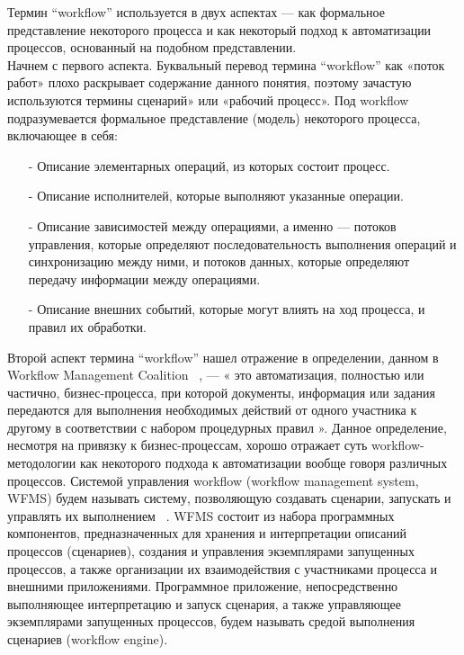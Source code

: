 \documentclass[a4paper,12pt]{article}
\begin{document}
Термин “workflow” используется в двух аспектах — как формальное
представление некоторого процесса и как некоторый подход к автоматизации процессов, основанный на подобном представлении.\\
Начнем с первого аспекта. Буквальный перевод термина “workflow”
как «поток работ» плохо раскрывает содержание данного понятия, поэтому
зачастую используются термины сценарий» или «рабочий процесс». Под workflow подразумевается формальное представление (модель) некоторого процесса, включающее в себя:
\begin{enumerate}
\item[-] Описание элементарных операций, из которых состоит процесс.
\item[-] Описание исполнителей, которые выполняют указанные операции.
\item[-] Описание зависимостей между операциями, а именно — потоков управления, которые определяют последовательность выполнения
операций и синхронизацию между ними, и потоков данных, которые
определяют передачу информации между операциями.
\item[-] Описание внешних событий, которые могут влиять на ход процесса, и правил их обработки.
\end{enumerate}
Второй аспект термина “workflow” нашел отражение в определении,
данном в Workflow Management Coalition ~\cite{2}, — « это автоматизация, полностью или частично, бизнес-процесса, при которой документы, информация или задания передаются для выполнения необходимых действий
от одного участника к другому в соответствии с набором процедурных
правил ». Данное определение, несмотря на привязку к бизнес-процессам, хорошо отражает суть workflow-методологии как некоторого подхода
к автоматизации вообще говоря различных процессов.
Системой управления workflow (workflow management system, WFMS)
будем называть систему, позволяющую создавать сценарии, запускать
и управлять их выполнением ~\cite{2}. WFMS состоит из набора программных
компонентов, предназначенных для хранения и интерпретации описаний
процессов (сценариев), создания и управления экземплярами запущенных процессов, а также организации их взаимодействия с участниками
процесса и внешними приложениями.
Программное приложение, непосредственно выполняющее интерпретацию и запуск сценария, а также управляющее экземплярами запущенных процессов, будем называть средой выполнения сценариев (workflow engine).
\end{document}

